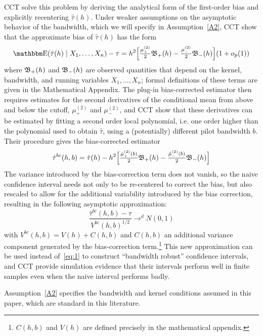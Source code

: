 \documentclass[12pt,fleqn]{article}
\begin{document}
CCT solve this problem by deriving the analytical form of the first-order bias
and explicitly recentering $\hat\tau(h)$. Under weaker assumptions on the
asymptotic behavior of the bandwidth, which we will specify in
Assumption~\ref{A2}, CCT show that the approximate bias of $\hat\tau(h)$ has the
form
\begin{equation*}
  \E(\hat{\tau}(h) \mid X_1,\dots,X_n) - \tau =
  h^{2}\Big[ \tfrac{\mu_{+}^{(2)}}{2}\Bf_{+}(h)
  - \tfrac{\mu_{-}^{(2)}}{2}\Bf_{-}(h) \Big]
  (1+o_{p}(1))
\end{equation*}
where $\mathfrak{B}_{+}(h)$ and $\mathfrak{B}_{-}(h)$ are observed quantities that depend on the
kernel, bandwidth, and running variables $X_1,\dots,X_n$; formal definitions of
these terms are given in the Mathematical Appendix. The plug-in bias-corrected
estimator then requires estimates
for the second derivatives of the conditional mean from above and below the
cutoff, $\mu_{+}^{(2)}$ and $\mu_{-}^{(2)}$, and CCT show that these derivatives
can be estimated by fitting a second order local polynomial, i.e. one order
higher than the polynomial used to obtain $\hat{\tau}$, using a (potentially)
different pilot bandwidth $b$. Their procedure gives the bias-corrected
estimator
\begin{gather*}
  \hat{\tau}^{bc}(h, b) = \hat{\tau}(h) - h^{2}
  \Big[\tfrac{\hat{\mu}_{+}^{(2)}(b)}{2} \mathfrak{B}_{+}(h)
  - \tfrac{\hat{\mu}_{-}^{(2)}(b)}{2}\mathfrak{B}_{-}(h) \Big]
\end{gather*}
The variance introduced by the bias-correction term does not vanish, so the
naive confidence interval needs not only to be re-centered to correct the bias,
but also rescaled to allow for the additional variability introduced by the bias
correction, resulting in the following asymptotic approximation:
\begin{equation*}
  \frac{\hat{\tau}^{bc}(h, b) - \tau}{V^{bc}(h, b)^{1/2}} \to^d N(0,1)
\end{equation*}
with $V^{bc}(h, b) = V(h) + C(h, b)$ and $C(h, b)$ an additional variance component
generated by the bias-correction term.\footnote{%
  $C(h,b)$ and $V(h)$ are defined precisely in the mathematical appendix.} %
This new approximation can be used
instead of~\eqref{eq:1} to construct ``bandwidth robust'' confidence intervals,
and CCT provide simulation evidence that their intervals perform well in finite
samples even when the naive interval performs badly.

Assumption~\ref{A2} specifies the bandwidth and kernel conditions assumed in this
paper, which are standard in this literature.
\end{document}

